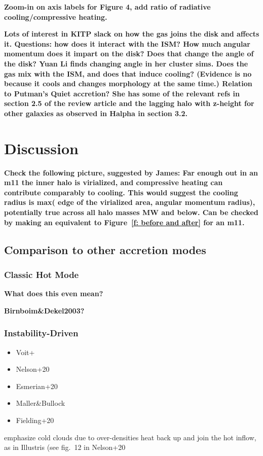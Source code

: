 \documentclass[fleqn,usenatbib]{mnras}
\begin{document}
\textbf{Zoom-in on axis labels for Figure 4, add ratio of radiative cooling/compressive heating.}

\textbf{
Lots of interest in KITP slack on how the gas joins the disk and affects it.
Questions: how does it interact with the ISM?
How much angular momentum does it impart on the disk? Does that change the angle of the disk? Yuan Li finds changing angle in her cluster sims.
Does the gas mix with the ISM, and does that induce cooling? (Evidence is no because it cools and changes morphology at the same time.)
Relation to Putman's Quiet accretion? She has some of the relevant refs in section 2.5 of the review article and the lagging halo with z-height for other galaxies as observed in Halpha in section 3.2.
}

\section{Discussion}
\label{s: discussion}

\textbf{
Check the following picture, suggested by James:
Far enough out in an m11 the inner halo is virialized, and compressive heating can contribute comparably to cooling.
This would suggest the cooling radius is max( edge of the virialized area, angular momentum radius), potentially true across all halo masses MW and below.
Can be checked by making an equivalent to Figure~\ref{f: before and after} for an m11.
}

\subsection{Comparison to other accretion modes}
\label{s: other modes}

\subsubsection{Classic Hot Mode}

\textbf{What does this even mean?}

\textbf{Birnboim\&Dekel2003?}

\subsubsection{Instability-Driven}

\begin{itemize}
\item Voit+
\item  Nelson+20
\item  Esmerian+20
\item  Maller\&Bullock
\item Fielding+20
\end{itemize}
emphasize cold clouds due to over-densities heat back up and join the hot inflow, as in Illustris (see fig.~12 in Nelson+20
\end{document}
